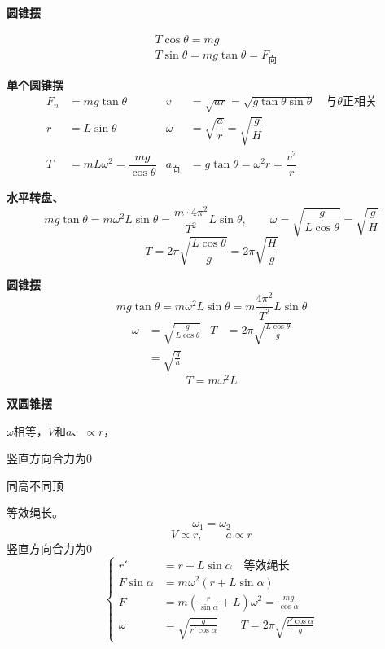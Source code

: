 \textbf{圆锥摆}


\begin{align*}
& T\cos\theta=mg\\
& T\sin\theta=mg\tan\theta=F_{\text{向}}
\end{align*}

\textbf{单个圆锥摆}
\begin{align*}
F_n&=mg\tan\theta & v&=\sqrt{ar}=\sqrt{g\tan\theta\sin\theta}\quad\text{与}\theta\text{正相关}\\ %
r&=L\sin\theta & \omega&=\sqrt{\dfrac{a}{r}}=\sqrt{\dfrac{g}{H}}\\
T&=mL\omega^2=\dfrac{mg}{\cos\theta} & a_{\text{向}}&=g\tan\theta=\omega^2r=\dfrac{v^2}{r}
\end{align*}

\textbf{水平转盘、}
\[ mg\tan\theta=m\omega^2L\sin\theta=\dfrac{m\cdot4\pi^2}{T^2}L\sin\theta,\qquad \omega=\sqrt{\dfrac{g}{L\cos\theta}}=\sqrt{\dfrac{g}{H}} \]
\[ T=2\pi\sqrt{\dfrac{L\cos\theta}{g}}=2\pi\sqrt{\dfrac{H}{g}} \]

\textbf{圆锥摆}
\[ mg\tan\theta=m\omega^2L\sin\theta=m\frac{4\pi^2}{T^2}L\sin\theta \]
\begin{align*}
\omega&=\sqrt{\frac{g}{L\cos\theta}} & T&=2\pi\sqrt{\frac{L\cos\theta}{g}}\\
&=\sqrt{\frac{g}{h}}
\end{align*}
\[ T=m\omega^2L \]

\textbf{双圆锥摆}


$\omega$相等，$V$和$a$、$\propto r$，

竖直方向合力为0

同高不同顶\par
等效绳长。
\[ \omega_1=\omega_2 \]
\[ V\propto r,\qquad a\propto r \]
竖直方向合力为0
\[
\left\{\begin{aligned}
r'&=r+L\sin\alpha\quad\text{等效绳长}\\
F\sin\alpha&=m\omega^2(r+L\sin\alpha)\\
F&=m\left(\frac{r}{\sin\alpha}+L\right)\omega^2=\frac{mg}{\cos\alpha}\\
\omega&=\sqrt{\frac{g}{r'\cos\alpha}}\qquad T=2\pi\sqrt{\frac{r'\cos\alpha}{g}}
\end{aligned}\right.
\] %

